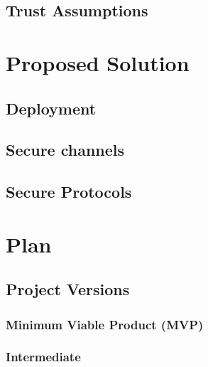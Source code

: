 \documentclass[a4paper]{article}
\begin{document}
\subsection{Trust Assumptions}

\section{Proposed Solution}

\subsection{Deployment}

\subsection{Secure channels}

\subsection{Secure Protocols}

\section{Plan}

\subsection{Project Versions}

\subsubsection{Minimum Viable Product (MVP)}

\subsubsection{Intermediate}
\end{document}
